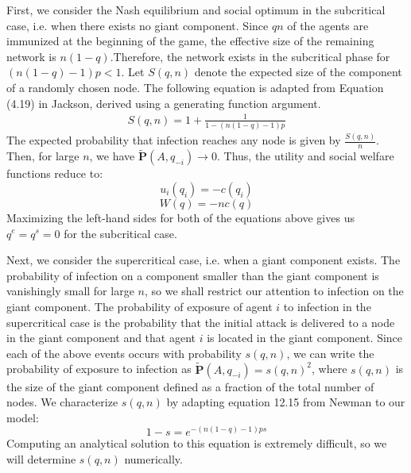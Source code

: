 \documentclass{article}
\theoremstyle{plain}
\begin{document}
First, we consider the Nash equilibrium and social optimum in the subcritical case, i.e. when there exists no giant component. Since $qn$ of the agents are immunized at the beginning of the game, the effective size of the remaining network is $n(1-q)$.Therefore, the network exists in the subcritical phase for $(n(1-q)-1)p < 1$. Let $S(q, n)$ denote the expected size of the component of a randomly chosen node. The following equation is adapted from Equation (4.19) in Jackson, derived using a generating function argument.
\begin{eqnarray}
	S(q, n) = 1 + \frac{1}{1 - (n(1-q)-1)p}
\end{eqnarray}
The expected probability that infection reaches any node is given by $\frac{S(q, n)}{n}$. Then, for large $n$, we have $\tilde{\textbf{P}}(A,q_{-i}) \rightarrow 0$. Thus, the utility and social welfare functions reduce to:
\begin{equation}
	u_i(q_i) = -c(q_i)
\end{equation}
\begin{equation}
	W(q) = -nc(q)
\end{equation}
Maximizing the left-hand sides for both of the equations above gives us $q^e = q^s = 0$ for the subcritical case. 

Next, we consider the supercritical case, i.e. when a giant component exists. The probability of infection on a component smaller than the giant component is vanishingly small for large $n$, so we shall restrict our attention to infection on the giant component. The probability of exposure of agent $i$ to infection in the supercritical case is the probability that the initial attack is delivered to a node in the giant component and that agent $i$ is located in the giant component. Since each of the above events occurs with probability $s(q, n)$, we can write the probability of exposure to infection as $\tilde{\textbf{P}}(A,q_{-i}) = s(q, n)^2$, where $s(q, n)$ is the size of the giant component defined as a fraction of the total number of nodes. We characterize $s(q, n)$ by adapting equation 12.15 from Newman to our model:
\begin{equation}
	1 - s = e^{-(n(1-q)-1)ps}
\end{equation}
Computing an analytical solution to this equation is extremely difficult, so we will determine $s(q, n)$ numerically. 
\end{document}
